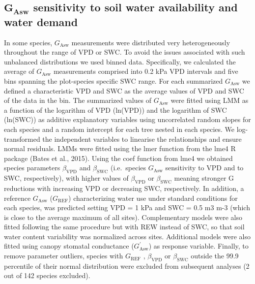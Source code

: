 \documentclass[11pt,twoside]{reedthesis}
\begin{document}
\subsection{\texorpdfstring{\(\textbf{G}_{\textbf{Asw}}\) sensitivity to
soil water availability and water
demand}{\textbackslash{}textbf\{G\}\_\{\textbackslash{}textbf\{Asw\}\} sensitivity to soil water availability and water demand}}\label{textbfg_textbfasw-sensitivity-to-soil-water-availability-and-water-demand}

In some species, \(G_{\text{Asw}}\) measurements were distributed very
heterogeneously throughout the range of VPD or SWC. To avoid the issues
associated with such unbalanced distributions we used binned data.
Specifically, we calculated the average of \(G_{\text{Asw}}\)
measurements comprised into 0.2 kPa VPD intervals and five bins spanning
the plot-species specific SWC range. For each summarized
\(G_{\text{Asw}}\) we defined a characteristic VPD and SWC as the
average values of VPD and SWC of the data in the bin. The summarized
values of \(G_{\text{Asw}}\) were fitted using LMM as a function of the
logarithm of VPD (ln(VPD)) and the logarithm of SWC (ln(SWC)) as
additive explanatory variables using uncorrelated random slopes for each
species and a random intercept for each tree nested in each species. We
log-transformed the independent variables to linearise the relationships
and ensure normal residuals. LMMs were fitted using the lmer function
from the lme4 R package (Bates et al., 2015). Using the coef function
from lme4 we obtained species parameters \(\beta_{\text{VPD}}\) and
\(\beta_{\text{SWC}}\) (i.e.~species \(G_{\text{Asw}}\) sensitivity to
VPD and to SWC, respectively), with higher values of
\(\beta_{\text{VPD}}\) or \(\beta_{\text{SWC}}\) meaning stronger G
reductions with increasing VPD or decreasing SWC, respectively. In
addition, a reference \(G_{\text{Asw}}\) (\(G_{\text{REF}}\))
characterizing water use under standard conditions for each species, was
predicted setting VPD = 1 kPa and SWC = 0.5 m3 m-3 (which is close to
the average maximum of all sites). Complementary models were also fitted
following the same procedure but with REW instead of SWC, so that soil
water content variability was normalized across sites. Additional models
were also fitted using canopy stomatal conductance
(\(G_{\text{Asw}}^{'}\)) as response variable. Finally, to remove
parameter outliers, species with \(G_{\text{REF}}\) ,
\(\beta_{\text{VPD}}\) or \(\beta_{\text{SWC}}\) outside the 99.9
percentile of their normal distribution were excluded from subsequent
analyses (2 out of 142 species excluded).\par
\end{document}
